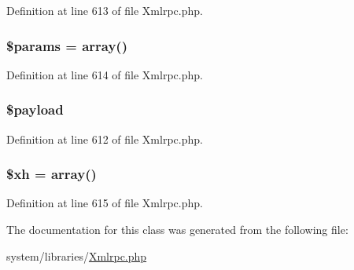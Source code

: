 Definition at line 613 of file Xmlrpc.\-php.

\hypertarget{class_x_m_l___r_p_c___message_afe68e6fbe7acfbffc0af0c84a1996466}{
\subsubsection[{\$params}]{\setlength{\rightskip}{0pt plus 5cm}\$params = array()}}\label{class_x_m_l___r_p_c___message_afe68e6fbe7acfbffc0af0c84a1996466}


Definition at line 614 of file Xmlrpc.\-php.

\hypertarget{class_x_m_l___r_p_c___message_ab6c08f2335783abfa1bce5d22fb3466e}{
\subsubsection[{\$payload}]{\setlength{\rightskip}{0pt plus 5cm}\$payload}}\label{class_x_m_l___r_p_c___message_ab6c08f2335783abfa1bce5d22fb3466e}


Definition at line 612 of file Xmlrpc.\-php.

\hypertarget{class_x_m_l___r_p_c___message_aad3b174789357e147f0daa5b69930ac8}{
\subsubsection[{\$xh}]{\setlength{\rightskip}{0pt plus 5cm}\$xh = array()}}\label{class_x_m_l___r_p_c___message_aad3b174789357e147f0daa5b69930ac8}


Definition at line 615 of file Xmlrpc.\-php.



The documentation for this class was generated from the following file\-:\begin{DoxyCompactItemize}
\item 
system/libraries/\hyperlink{_xmlrpc_8php}{Xmlrpc.\-php}\end{DoxyCompactItemize}
